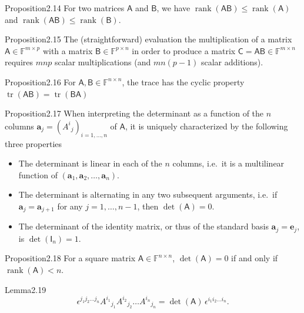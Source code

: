 \begin{res}{Proposition}{2.14}
For two matrices $\mathsf A$ and $\mathsf B$, we have $\operatorname{rank}(\mathsf{AB})\le\operatorname{rank}(\mathsf A)$ and $\operatorname{rank}(\mathsf{AB})\le\operatorname{rank}(\mathsf B)$.
\end{res}

\begin{res}{Proposition}{2.15}
The (straightforward) evaluation the multiplication of a matrix $\mathsf A\in\mathbb F^{m\times p}$ with a matrix $\mathsf B\in\mathbb F^{p\times n}$ in order to produce a matrix $\mathsf C=\mathsf{AB}\in\mathbb F^{m\times n}$ requires $mnp$ scalar multiplications (and $mn(p-1)$ scalar additions).
\end{res}

\begin{res}{Proposition}{2.16}
For $\mathsf A,\mathsf B\in\mathbb F^{n\times n}$, the trace has the cyclic property $\operatorname{tr}(\mathsf{AB})=\operatorname{tr}(\mathsf{BA})$
\end{res}

\begin{res}{Proposition}{2.17}
When interpreting the determinant as a function of the $n$ columns $\boldsymbol a_j=(A^i{}_j)_{i=1,\dots,n}$ of $\mathsf A$, it is uniquely characterized by the following three properties
\begin{itemize}
\item The determinant is linear in each of the $n$ columns, i.e.\ it is a multilinear function of $(\boldsymbol a_1,\boldsymbol a_2,\dots,\boldsymbol a_n)$.
\item The determinant is alternating in any two subsequent arguments, i.e.\ if $\boldsymbol a_j=\boldsymbol a_{j+1}$ for any $j=1,\dots,n-1$, then $\det(\mathsf A)=0$.
\item The determinant of the identity matrix, or thus of the standard basis $\boldsymbol a_j=\boldsymbol e_j$, is $\det(\mathsf I_n)=1$.
\end{itemize}
\end{res}

\begin{res}{Proposition}{2.18}
For a square matrix $\mathsf A\in\mathbb F^{n\times n}$, $\det(\mathsf A)=0$ if and only if $\operatorname{rank}(\mathsf A)<n$.
\end{res}

\begin{res}{Lemma}{2.19}
\begin{equation}\epsilon^{j_1j_2\ldots j_n}A^{i_1}{}_{j_1}A^{i_2}{}_{j_2}\ldots A^{i_n}{}_{j_n}=\det(\mathsf A)\,\epsilon^{i_1i_2\ldots i_n}.\tag{2.12}\end{equation}
\end{res}

